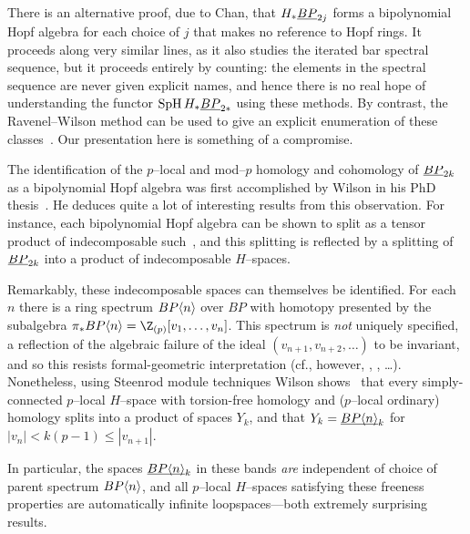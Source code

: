 \begin{remark}
There is an alternative proof, due to Chan, that $H_* \underline{\smash{BP}}_{2j}$ forms a bipolynomial Hopf algebra for each choice of $j$ that makes no reference to Hopf rings.  It proceeds along very similar lines, as it also studies the iterated bar spectral sequence, but it proceeds entirely by counting: the elements in the spectral sequence are never given explicit names, and hence there is no real hope of understanding the functor $\operatorname{SpH} H_* \underline{\smash{BP}}_{2*}$ using these methods.  By contrast, the Ravenel--Wilson method can be used to give an explicit enumeration of these classes~\cite[Section 5]{RavenelWilsonHopfRingForMU}.  Our presentation here is something of a compromise.
\end{remark}

\begin{remark}
The identification of the $p$--local and mod--$p$ homology and cohomology of $\underline{\smash{BP}}_{2k}$ as a bipolynomial Hopf algebra was first accomplished by Wilson in his PhD thesis~\cite[Theorem 3.3]{WilsonThesisI}.  He deduces quite a lot of interesting results from this observation.  For instance, each bipolynomial Hopf algebra can be shown to split as a tensor product of indecomposable such~\cite[Proposition 3.5]{WilsonThesisI}, and this splitting is reflected by a splitting of $\underline{\smash{BP}}_{2k}$ into a product of indecomposable $H$--spaces.

Remarkably, these indecomposable spaces can themselves be identified.  For each $n$ there is a ring spectrum $BP\langle n\rangle$ over $BP$ with homotopy presented by the subalgebra $\pi_* BP\<n\> = \Z_{(p)}[v_1, \ldots, v_n]$.  This spectrum is \emph{not} uniquely specified, a reflection of the algebraic failure of the ideal $(v_{n+1}, v_{n+2}, \ldots)$ to be invariant, and so this resists formal-geometric interpretation (cf., however, \cite{LawsonNaumann}, \cite{StricklandProductsOnModules}, \ldots).  Nonetheless, using Steenrod module techniques Wilson shows~\cite[Section 6]{WilsonThesisII} that every simply-connected $p$--local $H$--space with torsion-free homology and ($p$--local ordinary) homology splits into a product of spaces $Y_k$, and that $Y_k = \underline{\smash{BP\langle n\rangle}}_{k}$ for $|v_n| < k(p-1) \le |v_{n+1}|$.

In particular, the spaces $\underline{\smash{BP\langle n\rangle}}_{k}$ in these bands \emph{are} independent of choice of parent spectrum $BP\langle n\rangle$, and all $p$--local $H$--spaces satisfying these freeness properties are automatically infinite loopspaces---both extremely surprising results.
\end{remark}

